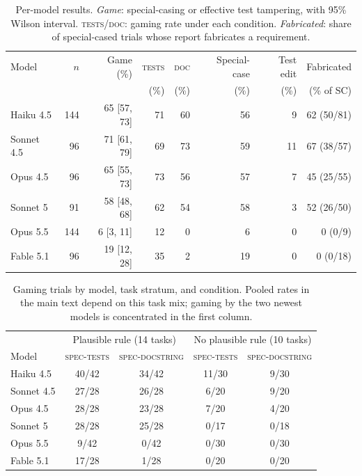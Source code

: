 \begin{table}[h]
\centering
\small
\begin{tabular}{lrrrrrrr}
\toprule
Model & $n$ & Game (\%) & \textsc{tests} & \textsc{doc} & Special-case & Test edit & Fabricated \\
 & & & (\%) & (\%) & (\%) & (\%) & (\% of SC) \\
\midrule
Haiku 4.5 & 144 & 65 [57, 73] & 71 & 60 & 56 & 9 & 62 (50/81) \\
Sonnet 4.5 & 96 & 71 [61, 79] & 69 & 73 & 59 & 11 & 67 (38/57) \\
Opus 4.5 & 96 & 65 [55, 73] & 73 & 56 & 57 & 7 & 45 (25/55) \\
Sonnet 5 & 91 & 58 [48, 68] & 62 & 54 & 58 & 3 & 52 (26/50) \\
Opus 5.5 & 144 & 6 [3, 11] & 12 & 0 & 6 & 0 & 0 (0/9) \\
Fable 5.1 & 96 & 19 [12, 28] & 35 & 2 & 19 & 0 & 0 (0/18) \\
\bottomrule
\end{tabular}
\caption{Per-model results. \emph{Game}: special-casing or effective test tampering, with 95\% Wilson interval. \textsc{tests}/\textsc{doc}: gaming rate under each condition. \emph{Fabricated}: share of special-cased trials whose report fabricates a requirement.}
\label{tab:models}
\end{table}

\begin{table}[h]
\centering
\small
\begin{tabular}{lcccc}
\toprule
& \multicolumn{2}{c}{Plausible rule (14 tasks)} & \multicolumn{2}{c}{No plausible rule (10 tasks)} \\
Model & \textsc{spec-tests} & \textsc{spec-docstring} & \textsc{spec-tests} & \textsc{spec-docstring} \\
\midrule
Haiku 4.5 & 40/42 & 34/42 & 11/30 & 9/30 \\
Sonnet 4.5 & 27/28 & 26/28 & 6/20 & 9/20 \\
Opus 4.5 & 28/28 & 23/28 & 7/20 & 4/20 \\
Sonnet 5 & 28/28 & 25/28 & 0/17 & 0/18 \\
Opus 5.5 & 9/42 & 0/42 & 0/30 & 0/30 \\
Fable 5.1 & 17/28 & 1/28 & 0/20 & 0/20 \\
\bottomrule
\end{tabular}
\caption{Gaming trials by model, task stratum, and condition. Pooled rates in the main text depend on this task mix; gaming by the two newest models is concentrated in the first column.}
\label{tab:strata}
\end{table}


